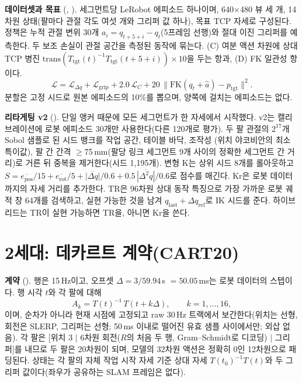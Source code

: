 \documentclass[conference,10pt]{IEEEtran}
\newcommand{\mm}{\,mm\xspace}
\begin{document}
\textbf{데이터셋과 목표} (, ). 세그먼트당 LeRobot 에피소드 하나이며,
640$\times$480 뷰 세 개, 14차원 상태(팔마다 관절 각도 여섯 개와 그리퍼 값 하나), 목표 TCP 자세로 구성된다. 정책은 누적 관절 변위
30개 $a_i=q_{t+5+i}-q_t$(5프레임 선행)와 절대 이진 그리퍼를 예측한다. 두 보조 손실이 관절 공간을 측정된 동작에 묶는다. (C) 여분
액션 차원에 상대 TCP 병진 $\mathrm{trans}(T_\text{tgt}(t)^{-1}T_\text{tgt}(t{+}5{+}i))\times10$을 두는 항과, (D) FK 일관성 항이다.
\begin{equation}
\mathcal{L}=\mathcal{L}_{\Delta q}+\mathcal{L}_\text{grip}+2.0\,\mathcal{L}_C+20\,\lVert \mathrm{FK}(q_t+\hat a)-p_\text{tgt}\rVert^2 .
\end{equation}
분할은 고정 시드로 원본 에피소드의 10\%를 뽑으며, 양쪽에 걸치는 에피소드는 없다.

\textbf{리타게팅 v2} (). 단일 앵커 때문에 모든 세그먼트가 한 자세에서 시작했다. v2는 캘리브레이션에 로봇
에피소드 30개만 사용한다(다른 120개로 평가). 두 팔 관절의 $2^{17}$개 Sobol 샘플로 된 시드 뱅크를 작업 공간, 테이블 바닥, 조작성
(위치 야코비안의 최소 특이값), 팔 간 간격 $\ge$75\mm{}(팔당 링크 세그먼트 9개 사이의 정확한 세그먼트 간 거리)로 거른 뒤 중복을
제거한다(시드 1{,}195개). 변형 K는 상위 시드 8개를 롤아웃하고
$S=\overline{e_\text{pos}}/15+\overline{e_\text{rot}}/5+\overline{|\Delta q|}/0.6+0.5\,\overline{|\Delta^2q|}/0.6$로 점수를 매긴다.
Kr은 로봇 데이터까지의 자세 거리를 추가한다. TR은 96차원 상대 동작 특징으로 가장 가까운 로봇 궤적 창 64개를 검색하고, 실현 가능한
것을 남겨 $q_\text{last}+\Delta q_\text{ref}$로 IK 시드를 준다. 하이브리드는 TR이 실현 가능하면 TR을, 아니면 Kr을 쓴다.

\section{2세대: 데카르트 계약(CART20)}\label{sec:gen2}
\textbf{계약} (). 행은 15\,Hz이고, 오프셋 $\Delta=3/59.94$\,s $=50.05$\,ms는 로봇 데이터의 스텝이다.
행 시각 $t$와 각 팔에 대해
\begin{equation}
A_k = T(t)^{-1}\,T(t+k\Delta),\qquad k=1,\dots,16 ,
\end{equation}
이며, 순차가 아니라 현재 시점에 고정되고 raw 30\,Hz 트랙에서 보간한다(위치는 선형, 회전은 SLERP, 그리퍼는 선형; 50\,ms 이내로
떨어진 유효 샘플 사이에서만; 외삽 없음). 각 팔은 [위치 3 $\mid$ 6차원 회전($R$의 처음 두 행, Gram--Schmidt로 디코딩) $\mid$
그리퍼]를 내므로 두 팔은 20차원이 되며, 모델의 32차원 액션은 정확히 0인 12차원으로 패딩된다. 상태는 각 팔의 자체 작업 시작 자세
기준 상대 자세 $T(t_0)^{-1}T(t)$와 두 그리퍼 값이다(좌우가 공유하는 SLAM 프레임은 없다).
\end{document}

